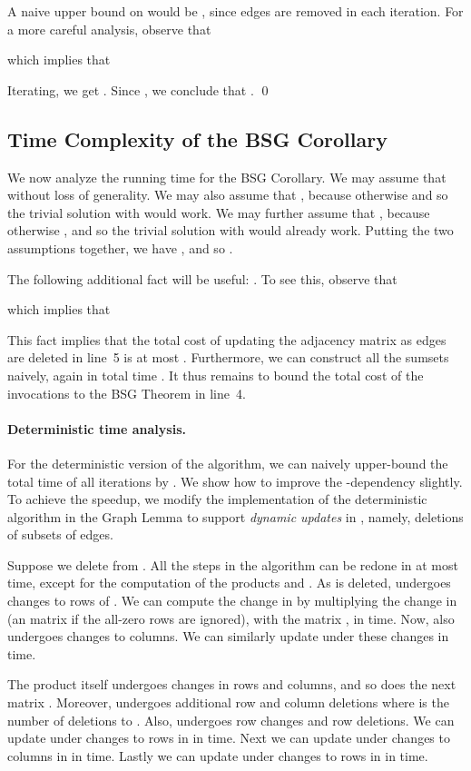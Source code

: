 \documentclass[11pt]{article}
\begin{document}
{A naive upper bound on  would be , since  edges are removed in each iteration.
For a more careful analysis, observe that

which implies that

Iterating, we get .
Since , we conclude that .
\qed




\subsection{Time Complexity of the BSG Corollary}\label{sec-bsg-corollary-time}

We now analyze the running time for the BSG Corollary.
We may assume that  without loss of generality.
We may also assume that ,
because otherwise
 and so the trivial solution with
 would work.
We may further assume that ,
because otherwise , and so the trivial
solution with  would already work.
Putting the two assumptions together, we have
, and
so .

The following additional fact will be useful:
.
To see this, observe that

which implies that


This fact implies that the total cost of updating the
adjacency matrix as edges are deleted in line~5 is
at most .
Furthermore, we can construct all the
sumsets  naively, again in total time
.
It thus remains to bound the total cost of the invocations
to the BSG Theorem in line~4.

\paragraph{Deterministic time analysis.}
For the deterministic version of the algorithm,
we can naively upper-bound the total time of all
 iterations by .
We show how to improve the -dependency slightly.
To achieve the speedup, we modify the implementation
of the deterministic algorithm in
the Graph Lemma to support \emph{dynamic updates}
in , namely, deletions of subsets of edges.

Suppose we delete  from .
All the steps in the algorithm can be redone in
at most  time,
except for the computation of the products 
and .  As  is deleted, 
undergoes changes to 
rows of .  We can compute the
change in  by multiplying the change in 
(an  matrix if the all-zero rows are ignored),
with the matrix , in  time.
Now,  also undergoes changes to  columns.
We can similarly update  under these changes
in  time.

The product  itself
undergoes changes in  rows and columns, and so does
the next matrix .  Moreover,  undergoes 
additional row and column deletions where  is the number of
deletions to .  Also,  undergoes
 row changes and  row deletions.
We can update 
under changes to  rows in  in
 time.  Next we can update 
under changes to  columns in  in
 time.   Lastly we can update  under
changes to  rows in  in  time.

}
\end{document}
